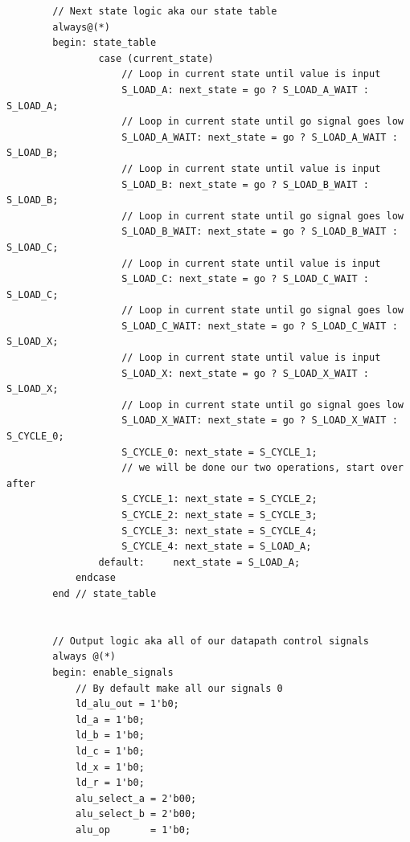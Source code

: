 \documentclass{article}
\begin{document}
\begin{verbatim}
        // Next state logic aka our state table
        always@(*)
        begin: state_table 
                case (current_state)
                    // Loop in current state until value is input
                    S_LOAD_A: next_state = go ? S_LOAD_A_WAIT : S_LOAD_A; 
                    // Loop in current state until go signal goes low
                    S_LOAD_A_WAIT: next_state = go ? S_LOAD_A_WAIT : S_LOAD_B; 
                    // Loop in current state until value is input
                    S_LOAD_B: next_state = go ? S_LOAD_B_WAIT : S_LOAD_B; 
                    // Loop in current state until go signal goes low
                    S_LOAD_B_WAIT: next_state = go ? S_LOAD_B_WAIT : S_LOAD_C; 
                    // Loop in current state until value is input
                    S_LOAD_C: next_state = go ? S_LOAD_C_WAIT : S_LOAD_C; 
                    // Loop in current state until go signal goes low
                    S_LOAD_C_WAIT: next_state = go ? S_LOAD_C_WAIT : S_LOAD_X; 
                    // Loop in current state until value is input
                    S_LOAD_X: next_state = go ? S_LOAD_X_WAIT : S_LOAD_X; 
                    // Loop in current state until go signal goes low
                    S_LOAD_X_WAIT: next_state = go ? S_LOAD_X_WAIT : S_CYCLE_0; 
                    S_CYCLE_0: next_state = S_CYCLE_1;
                    // we will be done our two operations, start over after
                    S_CYCLE_1: next_state = S_CYCLE_2;
                    S_CYCLE_2: next_state = S_CYCLE_3;
                    S_CYCLE_3: next_state = S_CYCLE_4;
                    S_CYCLE_4: next_state = S_LOAD_A; 
                default:     next_state = S_LOAD_A;
            endcase
        end // state_table
    

        // Output logic aka all of our datapath control signals
        always @(*)
        begin: enable_signals
            // By default make all our signals 0
            ld_alu_out = 1'b0;
            ld_a = 1'b0;
            ld_b = 1'b0;
            ld_c = 1'b0;
            ld_x = 1'b0;
            ld_r = 1'b0;
            alu_select_a = 2'b00;
            alu_select_b = 2'b00;
            alu_op       = 1'b0;


\end{verbatim}
\end{document}

